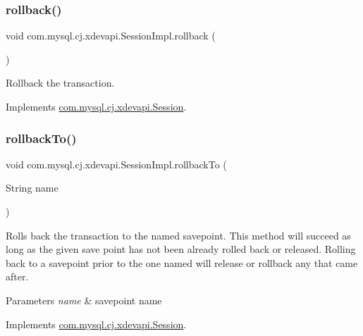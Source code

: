 \subsubsection{\texorpdfstring{rollback()}{rollback()}}
{\footnotesize\ttfamily void com.\+mysql.\+cj.\+xdevapi.\+Session\+Impl.\+rollback (\begin{DoxyParamCaption}{ }\end{DoxyParamCaption})}

Rollback the transaction. 

Implements \mbox{\hyperlink{interfacecom_1_1mysql_1_1cj_1_1xdevapi_1_1_session_a7c850a35b858307dd253bac93a187e8b}{com.\+mysql.\+cj.\+xdevapi.\+Session}}.

\mbox{\label{classcom_1_1mysql_1_1cj_1_1xdevapi_1_1_session_impl_adcd0910556c2529fe20a6fa85c96a88d}} 
\subsubsection{\texorpdfstring{rollback\+To()}{rollbackTo()}}
{\footnotesize\ttfamily void com.\+mysql.\+cj.\+xdevapi.\+Session\+Impl.\+rollback\+To (\begin{DoxyParamCaption}\item[{String}]{name }\end{DoxyParamCaption})}

Rolls back the transaction to the named savepoint. This method will succeed as long as the given save point has not been already rolled back or released. Rolling back to a savepoint prior to the one named will release or rollback any that came after.


\begin{DoxyParams}{Parameters}
{\em name} & savepoint name \\
\hline
\end{DoxyParams}


Implements \mbox{\hyperlink{interfacecom_1_1mysql_1_1cj_1_1xdevapi_1_1_session_a31dc4b454a765a159c591d5cc4f3d1cc}{com.\+mysql.\+cj.\+xdevapi.\+Session}}.

\mbox{\label{classcom_1_1mysql_1_1cj_1_1xdevapi_1_1_session_impl_a3eb7fd3b8ff1e2fc436fc271f1129fae}} 
